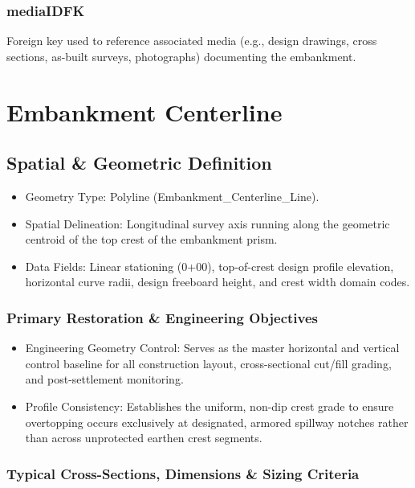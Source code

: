 \documentclass[
  letterpaper,
  DIV=11,
  numbers=noendperiod]{scrreprt}
\begin{document}
\subsection{mediaIDFK}\label{mediaidfk-1}

Foreign key used to reference associated media (e.g., design drawings,
cross sections, as-built surveys, photographs) documenting the
embankment.

\chapter{Embankment Centerline}\label{embankment-centerline}

\section{Spatial \& Geometric
Definition}\label{spatial-geometric-definition-2}

\begin{itemize}
\item
  Geometry Type: Polyline (Embankment\_Centerline\_Line).
\item
  Spatial Delineation: Longitudinal survey axis running along the
  geometric centroid of the top crest of the embankment prism.
\item
  Data Fields: Linear stationing (0+00), top-of-crest design profile
  elevation, horizontal curve radii, design freeboard height, and crest
  width domain codes.
\end{itemize}

\subsection{Primary Restoration \& Engineering
Objectives}\label{primary-restoration-engineering-objectives-1}

\begin{itemize}
\item
  Engineering Geometry Control: Serves as the master horizontal and
  vertical control baseline for all construction layout, cross-sectional
  cut/fill grading, and post-settlement monitoring.
\item
  Profile Consistency: Establishes the uniform, non-dip crest grade to
  ensure overtopping occurs exclusively at designated, armored spillway
  notches rather than across unprotected earthen crest segments.
\end{itemize}

\subsection{Typical Cross-Sections, Dimensions \& Sizing
Criteria}\label{typical-cross-sections-dimensions-sizing-criteria-2}
\end{document}
